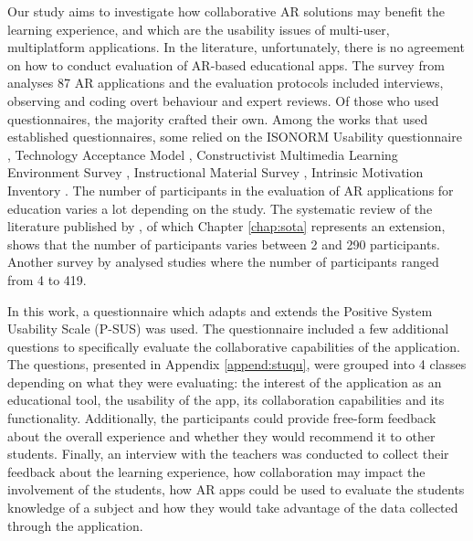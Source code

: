 Our study aims to investigate how collaborative AR solutions may benefit the learning experience, and which are the usability issues of multi-user, multiplatform applications.
In the literature, unfortunately, there is no agreement on how to conduct evaluation of AR-based educational apps.
The survey from \cite{santos2013augmented} analyses 87 AR applications and the evaluation protocols included interviews, observing and coding overt behaviour and expert reviews.
Of those who used questionnaires, the majority crafted their own.
Among the works that used established questionnaires, some relied on the ISONORM Usability questionnaire \citep{prumper1999test}, Technology Acceptance Model \citep{davis1996critical}, Constructivist Multimedia Learning Environment Survey \citep{maor1999teacher}, Instructional Material Survey \citep{keller1987development}, Intrinsic Motivation Inventory \citep{ryan2000self}.
The number of participants in the evaluation of AR applications for education varies a lot depending on the study.
The systematic review of the literature published by \cite{masneri2020work}, of which Chapter \ref{chap:sota} represents an extension, shows that the number of participants varies between 2 and 290 participants. Another survey by \cite{santos2013augmented} analysed studies where the number of participants ranged from 4 to 419.

In this work, a questionnaire which adapts and extends the Positive System Usability Scale (P-SUS) \citep{brooke1996sus, sauro2011designing} was used. The questionnaire included a few additional questions to specifically evaluate the collaborative capabilities of the application.
The questions, presented in Appendix \ref{append:stuqu}, were grouped into 4 classes depending on what they were evaluating: the interest of the application as an educational tool, the usability of the app, its collaboration capabilities and its functionality.
Additionally, the participants could provide free-form feedback about the overall experience and whether they would recommend it to other students.
Finally, an interview with the teachers was conducted to collect their feedback about the learning experience, how collaboration may impact the involvement of the students, how  AR apps could be used to evaluate the students knowledge of a subject and how they would take advantage of the data collected through the application.

